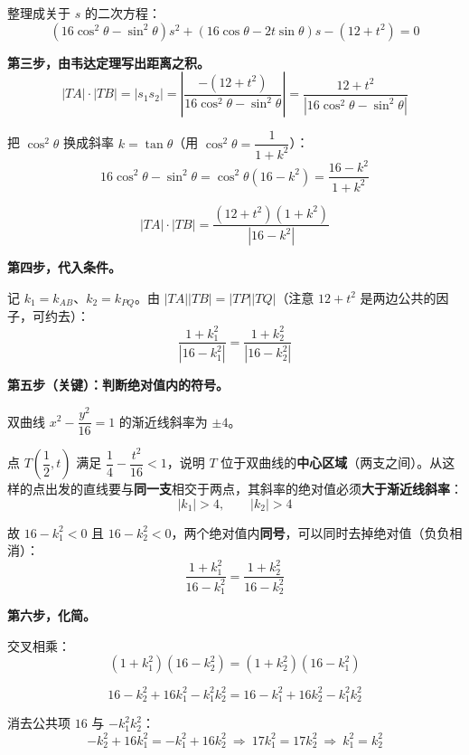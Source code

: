 \begin{answer}
整理成关于 $s$ 的二次方程：
\nopagebreak[4]
\[\left(16\cos^{2}\theta-\sin^{2}\theta\right)s^{2}+\left(16\cos\theta-2t\sin\theta\right)s-\left(12+t^{2}\right)=0\]

\textbf{第三步，由韦达定理写出距离之积。}
\nopagebreak[4]
\[|TA|\cdot|TB|=\left|s_1s_2\right|=\left|\frac{-\left(12+t^{2}\right)}{16\cos^{2}\theta-\sin^{2}\theta}\right|=\frac{12+t^{2}}{\left|16\cos^{2}\theta-\sin^{2}\theta\right|}\]

把 $\cos^2\theta$ 换成斜率 $k=\tan\theta$（用 $\cos^{2}\theta=\dfrac1{1+k^{2}}$）：
\nopagebreak[4]
\[16\cos^{2}\theta-\sin^{2}\theta=\cos^{2}\theta\left(16-k^{2}\right)=\frac{16-k^{2}}{1+k^{2}}\]

\nopagebreak[4]
\[|TA|\cdot|TB|=\frac{\left(12+t^{2}\right)\left(1+k^{2}\right)}{\left|16-k^{2}\right|}\]

\textbf{第四步，代入条件。}

记 $k_1=k_{AB}$、$k_2=k_{PQ}$。由 $|TA||TB|=|TP||TQ|$（注意 $12+t^{2}$ 是两边公共的因子，可约去）：
\nopagebreak[4]
\[\frac{1+k_1^{2}}{\left|16-k_1^{2}\right|}=\frac{1+k_2^{2}}{\left|16-k_2^{2}\right|}\]

\textbf{第五步（关键）：判断绝对值内的符号。}

双曲线 $x^{2}-\dfrac{y^{2}}{16}=1$ 的渐近线斜率为 $\pm4$。

点 $T\left(\dfrac12,t\right)$ 满足 $\dfrac14-\dfrac{t^{2}}{16}<1$，说明 $T$ 位于双曲线的\textbf{中心区域}（两支之间）。从这样的点出发的直线要与\textbf{同一支}相交于两点，其斜率的绝对值必须\textbf{大于渐近线斜率}：
\nopagebreak[4]
\[\left|k_1\right|>4,\qquad \left|k_2\right|>4\]

故 $16-k_1^{2}<0$ 且 $16-k_2^{2}<0$，两个绝对值内\textbf{同号}，可以同时去掉绝对值（负负相消）：
\nopagebreak[4]
\[\frac{1+k_1^{2}}{16-k_1^{2}}=\frac{1+k_2^{2}}{16-k_2^{2}}\]

\textbf{第六步，化简。}

交叉相乘：
\nopagebreak[4]
\[\left(1+k_1^{2}\right)\left(16-k_2^{2}\right)=\left(1+k_2^{2}\right)\left(16-k_1^{2}\right)\]

\nopagebreak[4]
\[16-k_2^{2}+16k_1^{2}-k_1^{2}k_2^{2}=16-k_1^{2}+16k_2^{2}-k_1^{2}k_2^{2}\]

消去公共项 $16$ 与 $-k_1^{2}k_2^{2}$：
\nopagebreak[4]
\[-k_2^{2}+16k_1^{2}=-k_1^{2}+16k_2^{2}\ \Longrightarrow\ 17k_1^{2}=17k_2^{2}\ \Longrightarrow\ k_1^{2}=k_2^{2}\]


\end{answer}
